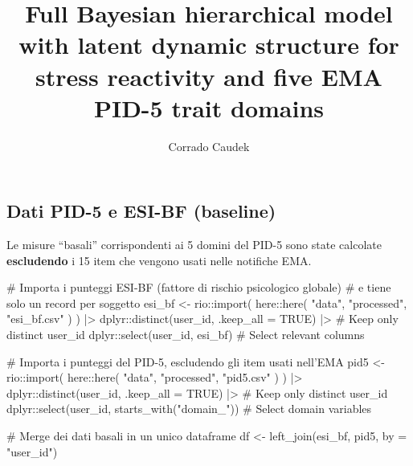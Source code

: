 \documentclass[
  11pt,
  a4paper,
  onecolumn]{article}
\title{Full Bayesian hierarchical model with latent dynamic structure
for stress reactivity and five EMA PID-5 trait domains}
\author{Corrado Caudek}
\date{}
\newenvironment{Shaded}{}{}
\newcommand{\AttributeTok}[1]{\textcolor[rgb]{0.84,0.23,0.29}{#1}}
\newcommand{\CommentTok}[1]{\textcolor[rgb]{0.42,0.45,0.49}{#1}}
\newcommand{\ConstantTok}[1]{\textcolor[rgb]{0.00,0.36,0.77}{#1}}
\newcommand{\FunctionTok}[1]{\textcolor[rgb]{0.44,0.26,0.76}{#1}}
\newcommand{\NormalTok}[1]{\textcolor[rgb]{0.14,0.16,0.18}{#1}}
\newcommand{\OtherTok}[1]{\textcolor[rgb]{0.44,0.26,0.76}{#1}}
\newcommand{\SpecialCharTok}[1]{\textcolor[rgb]{0.00,0.36,0.77}{#1}}
\newcommand{\StringTok}[1]{\textcolor[rgb]{0.01,0.18,0.38}{#1}}
\begin{document}
\maketitle


\subsection{Dati PID-5 e ESI-BF
(baseline)}\label{dati-pid-5-e-esi-bf-baseline}

Le misure ``basali'' corrispondenti ai 5 domini del PID-5 sono state
calcolate \textbf{escludendo} i 15 item che vengono usati nelle
notifiche EMA.

\begin{Shaded}
\begin{Highlighting}[]
\CommentTok{\# Importa i punteggi ESI{-}BF (fattore di rischio psicologico globale)}
\CommentTok{\# e tiene solo un record per soggetto}
\NormalTok{esi\_bf }\OtherTok{\textless{}{-}}\NormalTok{ rio}\SpecialCharTok{::}\FunctionTok{import}\NormalTok{(}
\NormalTok{  here}\SpecialCharTok{::}\FunctionTok{here}\NormalTok{(}
    \StringTok{"data"}\NormalTok{,}
    \StringTok{"processed"}\NormalTok{,}
    \StringTok{"esi\_bf.csv"}
\NormalTok{  )}
\NormalTok{) }\SpecialCharTok{|\textgreater{}}
\NormalTok{  dplyr}\SpecialCharTok{::}\FunctionTok{distinct}\NormalTok{(user\_id, }\AttributeTok{.keep\_all =} \ConstantTok{TRUE}\NormalTok{) }\SpecialCharTok{|\textgreater{}} \CommentTok{\# Keep only distinct user\_id}
\NormalTok{  dplyr}\SpecialCharTok{::}\FunctionTok{select}\NormalTok{(user\_id, esi\_bf) }\CommentTok{\# Select relevant columns}

\CommentTok{\# Importa i punteggi del PID{-}5, escludendo gli item usati nell’EMA}
\NormalTok{pid5 }\OtherTok{\textless{}{-}}\NormalTok{ rio}\SpecialCharTok{::}\FunctionTok{import}\NormalTok{(}
\NormalTok{  here}\SpecialCharTok{::}\FunctionTok{here}\NormalTok{(}
    \StringTok{"data"}\NormalTok{,}
    \StringTok{"processed"}\NormalTok{,}
    \StringTok{"pid5.csv"}
\NormalTok{  )}
\NormalTok{) }\SpecialCharTok{|\textgreater{}}
\NormalTok{  dplyr}\SpecialCharTok{::}\FunctionTok{distinct}\NormalTok{(user\_id, }\AttributeTok{.keep\_all =} \ConstantTok{TRUE}\NormalTok{) }\SpecialCharTok{|\textgreater{}}  \CommentTok{\# Keep only distinct user\_id}
\NormalTok{  dplyr}\SpecialCharTok{::}\FunctionTok{select}\NormalTok{(user\_id, }\FunctionTok{starts\_with}\NormalTok{(}\StringTok{"domain\_"}\NormalTok{)) }\CommentTok{\# Select domain variables}

\CommentTok{\# Merge dei dati basali in un unico dataframe}
\NormalTok{df }\OtherTok{\textless{}{-}} \FunctionTok{left\_join}\NormalTok{(esi\_bf, pid5, }\AttributeTok{by =} \StringTok{"user\_id"}\NormalTok{)}
\end{Highlighting}
\end{Shaded}
\end{document}
